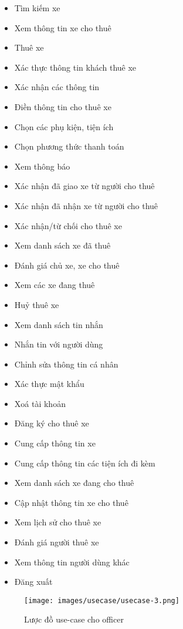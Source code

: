\documentclass[../main.tex]{subfiles}
\begin{document}
	\begin{itemize}
		\item Tìm kiếm xe
		\item Xem thông tin xe cho thuê
		\item Thuê xe
		\item Xác thực thông tin khách thuê xe
		\item Xác nhận các thông tin
		\item Điền thông tin cho thuê xe
		\item Chọn các phụ kiện, tiện ích
		\item Chọn phương thức thanh toán
		\item Xem thông báo
		\item Xác nhận đã giao xe từ người cho thuê
		\item Xác nhận đã nhận xe từ người cho thuê
		\item Xác nhận/từ chối cho thuê xe
		\item Xem danh sách xe đã thuê
		\item Đánh giá chủ xe, xe cho thuê
		\item Xem các xe đang thuê
		\item Huỷ thuê xe
		\item Xem danh sách tin nhắn
		\item Nhắn tin với người dùng
		\item Chỉnh sửa thông tin cá nhân
		\item Xác thực mật khẩu
		\item Xoá tài khoản
		\item Đăng ký cho thuê xe
		\item Cung cấp thông tin xe
		\item Cung cấp thông tin các tiện ích đi kèm
		\item Xem danh sách xe đang cho thuê
		\item Cập nhật thông tin xe cho thuê
		\item Xem lịch sử cho thuê xe
		\item Đánh giá người thuê xe
		\item Xem thông tin người dùng khác
		\item Đăng xuất
	\end{itemize}

	\begin{figure}[ht]
		\centering
		\texttt{[image: images/usecase/usecase-3.png]}
		\caption{Lược đồ use-case cho officer}
		\label{fig:usecase_3}
	\end{figure}
\end{document}
